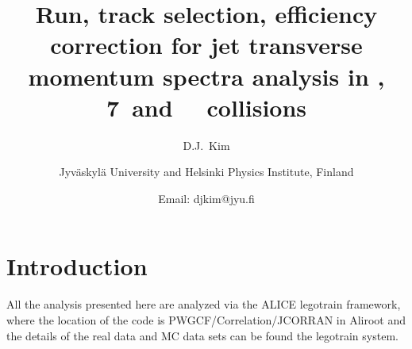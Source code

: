 \documentclass[ALICE,manyauthors]{ALICE_internal_notes}
\begin{document}
 

\begin{titlepage}
%


\title{Run, track selection, efficiency correction for jet transverse momentum spectra analysis in \pp {} , 7\tev\ and \ppb\ \tev\ collisions}
\ShortTitle{}   

\author{D.J.~Kim}%
\author{
Jyv\"askyl\"a University and Helsinki Physics Institute, Finland\\
}
\author{Email: djkim@jyu.fi}
%
%
\begin{abstract}

\end{abstract}

\end{titlepage}

\tableofcontents

\clearpage


\section{Introduction}
\label{sec:intro}
All the analysis presented here are analyzed via the ALICE legotrain framework, where the location of the code is PWGCF/Correlation/JCORRAN in Aliroot  and the details of the real data and MC data sets
can be found the legotrain system. 
\end{document}
